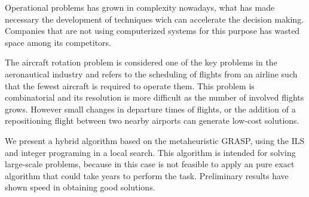 \documentclass[oneside,normaltoc,espacoumemeio,PGTEXdissertacao]{pgeeltex}
\begin{document}
\begin{abstractPGTEX}
Operational problems has grown in complexity nowadays, what has made
necessary the development of techniques wich can accelerate the decision
making. Companies that are not using computerized systems for this purpose has
wasted space among its competitors.

The aircraft rotation problem is considered one of the key problems in the
aeronautical industry and refers to the scheduling of flights from an
airline such that the fewest aircraft is required to operate them. This problem
is combinatorial and its resolution is more difficult as the number of involved
flights grows. However small changes in departure times of flights, or the
addition of a repositioning flight between two nearby airports can generate low-cost solutions.

We present a hybrid algorithm based on the metaheuristic GRASP, using the ILS
and integer programing in a local search. This algorithm is intended for solving
large-scale problems, because in this case is not feasible to apply an pure
exact algorithm that could take years to perform the task. Preliminary results
have shown speed in obtaining good solutions.

\end{abstractPGTEX}


\listadefiguras

\listadetabelas

\listadesiglas


\sumario
  






  

%

 




\anexo







  
\end{document}
